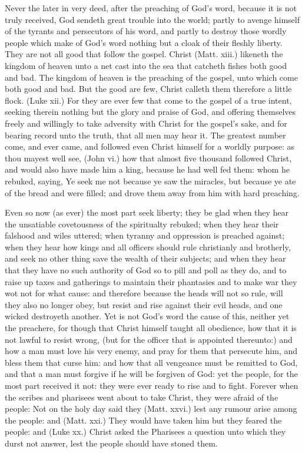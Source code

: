 Never the later in very deed, after the preaching of 
God's word, because it is not truly received, God sendeth 
great trouble into the world; partly to avenge himself of 
the tyrants and persecutors of his word, and partly to destroy
those wordly people which make of God's word nothing
but a cloak of their fleshly liberty. They are not 
all good that follow the gospel. Christ (Matt. xiii.) likeneth 
the kingdom of heaven unto a net cast into the sea that 
catcheth fishes both good and bad. The kingdom of 
heaven is the preaching of the gospel, unto which come 
both good and bad. But the good are few, Christ 
calleth them therefore a little flock. (Luke xii.) For they 
are ever few that come to the gospel of a true intent,
seeking therein nothing but the glory and praise of God,
and offering themselves freely and willingly to take adversity
with Christ for the gospel's sake, and for bearing 
record unto the truth, that all men may hear it. The 
greatest number come, and ever came, and followed even 
Christ himself for a worldly purpose: as thou mayest well 
see, (John vi.) how that almost five thousand followed 
Christ, and would also have made him a king, because he 
had well fed them: whom he rebuked, saying, Ye seek me 
not because ye saw the miracles, but because ye ate of the 
bread and were filled; and drove them away from him with 
hard preaching.

Even so now (as ever) the most part seek liberty; they 
be glad when they hear the unsatiable covetousness of the 
spiritualty rebuked; when they hear their falshood and 
wiles uttered; when tyranny and oppression is preached 
against; when they hear how kings and all officers should 
rule christianly and brotherly, and seek no other thing save 
the wealth of their subjects; and when they hear that they 
have no such authority of God so to pill and poll as they
do, and to raise up taxes and gatherings to maintain their 
phantasies and to make war they wot not for what cause:
and therefore because the heads will not so rule, will they 
also no longer obey, but resist and rise against their evil 
heads, and one wicked destroyeth another. Yet is not 
God's word the cause of this, neither yet the preachere, 
for though that Christ himself taught all obedience, how 
that it is not lawful to resist wrong, (but for the officer that 
is appointed thereunto:) and how a man must love his very 
enemy, and pray for them that persecute him, and bless 
them that curse him: and how that all vengeance must be 
remitted to God, and that a man must forgive if he will be 
forgiven of God: yet the people, for the most part received
it not: they were ever ready to rise and to fight.
Forever when the scribes and pharisees went about to take 
Christ, they were afraid of the people: Not on the holy 
day said they (Matt. xxvi.) lest any rumour arise among 
the people: and (Matt. xxi.) They would have taken him 
but they feared the people: and (Luke xx.) Christ asked 
the Pharisees a question unto which they durst not answer,
lest the people should have stoned them. 

